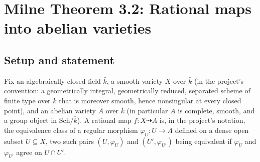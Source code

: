 \chapter{Milne Theorem 3.2: Rational maps into abelian varieties}
\label{chap:Albanese_Thm32RationalMapExtension}

%
%

\section{Setup and statement}
\label{sec:thm32_setup}

Fix an algebraically closed field \(\bar k\), a smooth variety \(X\) over \(\bar k\) (in the
project's convention: a geometrically integral, geometrically reduced, separated scheme of
finite type over \(\bar k\) that is moreover smooth, hence nonsingular at every closed point),
and an abelian variety \(A\) over \(\bar k\) (in particular \(A\) is complete, smooth, and a
group object in \(\mathrm{Sch}/\bar k\)). A rational map
\(f \colon X \dashrightarrow A\) is, in the project's notation, the equivalence class of a
regular morphism \(\varphi_U \colon U \to A\) defined on a dense open subset
\(U \subseteq X\), two such pairs \((U, \varphi_U)\) and \((U', \varphi_{U'})\) being equivalent
if \(\varphi_U\) and \(\varphi_{U'}\) agree on \(U \cap U'\).

